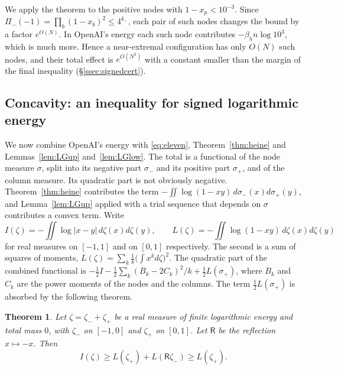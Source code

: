 \documentclass[11pt]{amsart}
\newtheorem{theorem}{Theorem}[section]
\theoremstyle{definition}
\theoremstyle{remark}
\numberwithin{equation}{section}
\begin{document}
We apply the theorem to the positive nodes with $1-x_p<10^{-3}$. Since
$\Pi_-(-1)=\prod_b(1-x_b)^2\le4^{k_-}$, each pair of such nodes changes the bound by a factor $e^{O(N)}$. In
OpenAI's energy each such node contributes $-\beta_hn\log10^3$, which is much more. Hence a near-extremal
configuration has only $O(N)$ such nodes, and their total effect is $e^{O(N^2)}$ with a constant smaller than
the margin of the final inequality (\S\ref{ssec:signedcert}).

\subsection{Concavity: an inequality for signed logarithmic energy}\label{ssec:reflection}
We now combine OpenAI's energy with \eqref{eq:eleven}, Theorem~\ref{thm:heine} and Lemmas~\ref{lem:LGup}
and~\ref{lem:LGlow}. The total is a functional of the node measure $\sigma$, split into its negative part
$\sigma_-$ and its positive part $\sigma_+$, and of the column measure. Its quadratic part is not obviously
negative. Theorem~\ref{thm:heine} contributes the term $-\iint\log(1-xy)\,d\sigma_-(x)d\sigma_+(y)$, and
Lemma~\ref{lem:LGup} applied with a trial sequence that depends on $\sigma$ contributes a convex term. Write
\[
 I(\zeta)=-\iint\log|x-y|\,d\zeta(x)d\zeta(y),\qquad L(\zeta)=-\iint\log(1-xy)\,d\zeta(x)d\zeta(y)
\]
for real measures on $[-1,1]$ and on $[0,1]$ respectively. The second is a sum of squares of moments,
$L(\zeta)=\sum_k\frac1k\bigl(\int x^kd\zeta\bigr)^2$. The quadratic part of the combined functional is
$-\frac12I-\frac12\sum_k(B_k-2C_k)^2/k+\frac12L(\sigma_+)$, where $B_k$ and $C_k$ are the power moments of the
nodes and the columns. The term $\frac12L(\sigma_+)$ is absorbed by the following theorem.

\begin{theorem}\label{thm:reflection}
Let $\zeta=\zeta_-+\zeta_+$ be a real measure of finite logarithmic energy and total mass $0$, with $\zeta_-$ on
$[-1,0]$ and $\zeta_+$ on $[0,1]$. Let $\mathsf R$ be the reflection $x\mapsto-x$. Then
\[
 I(\zeta)\ge L(\zeta_+)+L(\mathsf R\zeta_-)\ge L(\zeta_+).
\]
\end{theorem}
\end{document}
